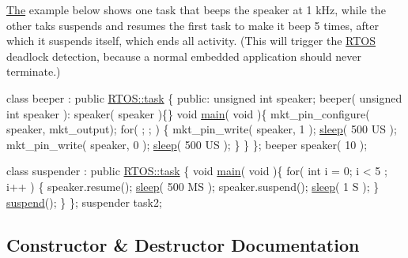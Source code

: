 \hyperlink{class_the}{The} example below shows one task that beeps the speaker at 1 k\+Hz, while the other taks suspends and resumes the first task to make it beep 5 times, after which it suspends itself, which ends all activity. (This will trigger the \hyperlink{class_r_t_o_s}{R\+T\+OS} deadlock detection, because a normal embedded application should never terminate.)


\begin{DoxyCode}
\textcolor{keyword}{class }beeper : \textcolor{keyword}{public} \hyperlink{class_r_t_o_s_1_1task}{RTOS::task} \{
\textcolor{keyword}{public}:
   \textcolor{keywordtype}{unsigned} \textcolor{keywordtype}{int} speaker;
   beeper( \textcolor{keywordtype}{unsigned} \textcolor{keywordtype}{int} speaker ): speaker( speaker )\{\}
   \textcolor{keywordtype}{void} \hyperlink{class_r_t_o_s_1_1task_addc6d52f8792ddba1158d7ae5ef0037d}{main}( \textcolor{keywordtype}{void} )\{
      mkt\_pin\_configure( speaker, mkt\_output);
      \textcolor{keywordflow}{for}( ; ; ) \{
         mkt\_pin\_write( speaker, 1  );
         \hyperlink{class_r_t_o_s_1_1task_a9d639b6f1147e0e3dbc603cdd8c52bd4}{sleep}( 500 US );
         mkt\_pin\_write( speaker, 0  );
         \hyperlink{class_r_t_o_s_1_1task_a9d639b6f1147e0e3dbc603cdd8c52bd4}{sleep}( 500 US );
      \}
   \}
\};
beeper speaker( 10 );

\textcolor{keyword}{class }suspender : \textcolor{keyword}{public} \hyperlink{class_r_t_o_s_1_1task}{RTOS::task} \{
   \textcolor{keywordtype}{void} \hyperlink{class_r_t_o_s_1_1task_addc6d52f8792ddba1158d7ae5ef0037d}{main}( \textcolor{keywordtype}{void} )\{
      \textcolor{keywordflow}{for}( \textcolor{keywordtype}{int} i = 0; i < 5 ; i++ ) \{
         speaker.resume();
         \hyperlink{class_r_t_o_s_1_1task_a9d639b6f1147e0e3dbc603cdd8c52bd4}{sleep}( 500 MS );
         speaker.suspend();
         \hyperlink{class_r_t_o_s_1_1task_a9d639b6f1147e0e3dbc603cdd8c52bd4}{sleep}( 1 S );
      \}
      \hyperlink{class_r_t_o_s_1_1task_a2e0e3c92d9479336535a2ef877103f36}{suspend}();
   \}
\};
suspender task2;
\end{DoxyCode}
 

\subsection{Constructor \& Destructor Documentation}
